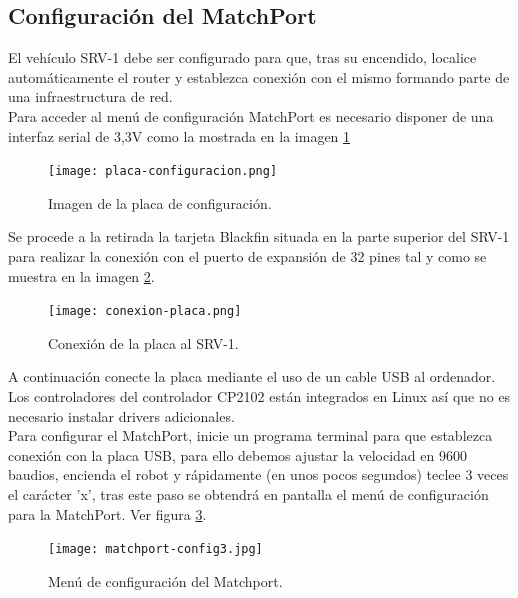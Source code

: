 \subsection{Configuración del MatchPort}

El vehículo SRV-1 debe ser configurado para que, tras su encendido, localice automáticamente el router y establezca conexión con el mismo formando parte de una infraestructura de red.\\

Para acceder al menú de configuración MatchPort es necesario disponer de una interfaz serial de 3,3V como la mostrada en la imagen \ref{fig:placa-configuracion}\\

\begin{figure}[H]
  \begin{center}
    \texttt{[image: placa-configuracion.png]}
  \end{center}
  \caption{Imagen de la placa de configuración.}
  \label{fig:placa-configuracion}
\end{figure}

Se procede a la retirada la tarjeta Blackfin situada en la parte superior del SRV-1 para realizar la conexión con el puerto de expansión de 32 pines tal y como se muestra en la imagen \ref{fig:conexion-placa}.\\

\begin{figure}[H]
  \begin{center}
    \texttt{[image: conexion-placa.png]}
  \end{center}
  \caption{Conexión de la placa al SRV-1.}
  \label{fig:conexion-placa}
\end{figure}

A continuación conecte la placa mediante el uso de un cable USB al ordenador. Los controladores del controlador CP2102 están integrados en Linux así que no es necesario instalar drivers adicionales. \\

Para configurar el MatchPort, inicie un programa terminal para que establezca conexión con la placa USB, para ello debemos ajustar la velocidad en 9600 baudios, encienda el robot y rápidamente (en unos pocos segundos) teclee 3 veces el carácter 'x', tras este paso se obtendrá en pantalla el menú de configuración para la MatchPort. Ver figura \ref{menu-matchport}.\\

\begin{figure}[H]
  \begin{center}
    \texttt{[image: matchport-config3.jpg]}
  \end{center}
  \caption{Menú de configuración del Matchport.}
  \label{menu-matchport}
\end{figure}

